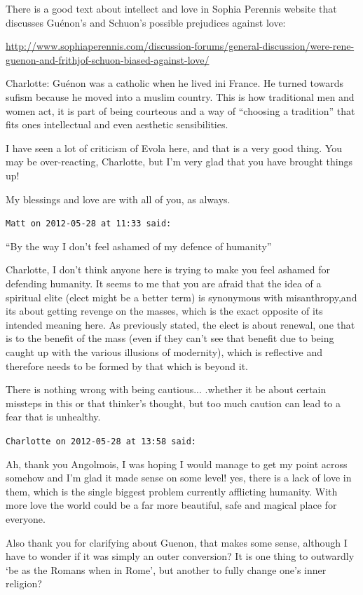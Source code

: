 \begin{footnotesize}
\begin{sffamily}
There is a good text about intellect and love in Sophia Perennis website that discusses Guénon's and Schuon's possible prejudices against love:

\url{http://www.sophiaperennis.com/discussion-forums/general-discussion/were-rene-guenon-and-frithjof-schuon-biased-against-love/}


Charlotte: Guénon was a catholic when he lived ini France. He turned towards sufism because he moved into a muslim country. This is how traditional men and women act, it is part of being courteous and a way of ``choosing a tradition'' that fits ones intellectual and even aesthetic sensibilities.

I have seen a lot of criticism of Evola here, and that is a very good thing. You may be over-reacting, Charlotte, but I'm very glad that you have brought things up!

My blessings and love are with all of you, as always.

\hfill

\texttt{Matt on 2012-05-28 at 11:33 said:}

``By the way I don't feel ashamed of my defence of humanity''

Charlotte, I don't think anyone here is trying to make you feel ashamed for defending humanity. It seems to me that you are afraid that the idea of a spiritual elite (elect might be a better term) is synonymous with misanthropy,and its about getting revenge on the masses, which is the exact opposite of its intended meaning here. As previously stated, the elect is about renewal, one that is to the benefit of the mass (even if they can't see that benefit due to being caught up with the various illusions of modernity), which is reflective and therefore needs to be formed by that which is beyond it.

There is nothing wrong with being cautious... .whether it be about certain missteps in this or that thinker's thought, but too much caution can lead to a fear that is unhealthy.

\hfill

\texttt{Charlotte on 2012-05-28 at 13:58 said:}

Ah, thank you Angolmois, I was hoping I would manage to get my point across somehow and I'm glad it made sense on some level! yes, there is a lack of love in them, which is the single biggest problem currently afflicting humanity. With more love the world could be a far more beautiful, safe and magical place for everyone.

Also thank you for clarifying about Guenon, that makes some sense, although I have to wonder if it was simply an outer conversion? It is one thing to outwardly `be as the Romans when in Rome', but another to fully change one's inner religion?


\end{sffamily}
\end{footnotesize}
